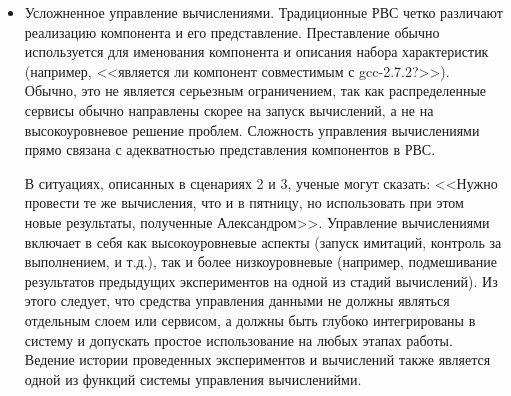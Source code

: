 \begin{itemize}
  \item Усложненное управление вычислениями. Традиционные РВС четко различают реализацию компонента и его представление. Преставление обычно используется для именования компонента и описания набора характеристик (например, <<является ли компонент совместимым с gcc-2.7.2?>>). Обычно, это не является серьезным ограничением, так как распределенные сервисы обычно направлены скорее на запуск вычислений, а не на высокоуровневое решение проблем. Сложность управления вычислениями прямо связана с адекватностью представления компонентов в РВС.
  
  В ситуациях, описанных в сценариях 2 и 3, ученые могут сказать: <<Нужно провести те же вычисления, что и в пятницу, но использовать при этом новые результаты, полученные Александром>>. Управление вычислениями включает в себя как высокоуровневые аспекты (запуск имитаций, контроль за выполнением, и т.д.), так и более низкоуровневые (например, подмешивание результатов предыдущих экспериментов на одной из стадий вычислений). Из этого следует, что средства управления данными не должны являться отдельным слоем или сервисом, а должны быть глубоко интегрированы в систему и допускать простое использование на любых этапах работы. Ведение истории проведенных экспериментов и вычислений также является одной из функций системы управления вычисленийми. 
\end{itemize}
